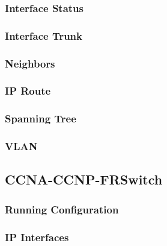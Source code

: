 \subsubsection{Interface Status}


\subsubsection{Interface Trunk}


\subsubsection{Neighbors}


\subsubsection{IP Route}


\subsubsection{Spanning Tree}


\subsubsection{VLAN}






\subsection{CCNA-CCNP-FRSwitch}
\subsubsection{Running Configuration}


\subsubsection{IP Interfaces}


